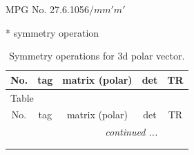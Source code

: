 \documentclass[fleqn,8pt]{jsarticle}
\begin{document}
\setcounter{MaxMatrixCols}{32}

\renewcommand{\tablename}{Table~}
\renewcommand{\figurename}{Figure~}
\begin{center}
\LARGE
MPG No. 27.6.105\quad$6/mm'm'$
\end{center}
* symmetry operation
\renewcommand{\arraystretch}{1.3}
\begin{longtable}{ccccc}
\caption{Symmetry operations for 3d polar vector.}
 \\
 \hline \hline
No. & tag & matrix (polar) & det & TR \\ \hline \endfirsthead

\multicolumn{4}{l}{\tablename\ \thetable{}} \\
 \hline \hline
No. & tag & matrix (polar) & det & TR \\ \hline \endhead

 \hline \hline
\multicolumn{4}{r}{\footnotesize\it continued ...} \\ \endfoot

 \hline \hline
\multicolumn{4}{r}{} \\ \endlastfoot


\end{longtable}
\end{document}
